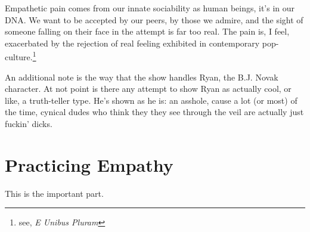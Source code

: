 \documentclass[../butidigress.tex]{subfiles}
\begin{document}
Empathetic pain comes from our innate sociability as human beings, it's in our DNA.
We want to be accepted by our peers, by those we admire, and the sight of someone falling on their face in the attempt is far too real.
The pain is, I feel, exacerbated by the rejection of real feeling exhibited in contemporary pop-culture.\footnote{see, \textit{E Unibus Pluram}}

An additional note is the way that the show handles Ryan, the B.J. Novak character.
At not point is there any attempt to show Ryan as actually cool, or like, a truth-teller type.
He's shown as he is: an asshole, cause a lot (or most) of the time, cynical dudes who think they they see through the veil are actually just fuckin' dicks.

\section{Practicing Empathy}
This is the important part.
\end{document}
